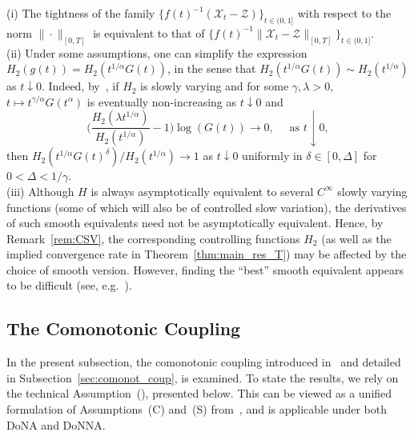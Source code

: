 \documentclass[en,oneside,bbfont,article]{amsart}
\theoremstyle{remark}
\newenvironment{remark}
    {\pushQED{\qed}\renewcommand{\qedsymbol}{$\Diamond$}\remarkx}
    {\popQED\endremarkx}
\theoremstyle{definition}
\theoremstyle{definition}
\newcommand\X{\bm{\mathcal{X}}}
\newcommand\ZZ{\bm{\mathcal{Z}}}
\newcommand\1{\mathds{1}}
\newcommand\da{\downarrow}
\begin{document}
\begin{remark}
\label{rem:thinning-result}
(i) The tightness of the family $\{f(t)^{-1}(\X_t-\ZZ)\}_{t\in(0,1]}$ with respect to the norm $\|\cdot\|_{[0,T]}$ is equivalent to that of $\{f(t)^{-1}\|\X_t-\ZZ\|_{[0,T]}\}_{t\in(0,1]}$.\\
(ii) Under some assumptions, one can simplify the expression $H_2(g(t))=H_2(t^{1/\alpha}G(t))$, in the sense that $H_2(t^{1/\alpha} G(t))\sim H_2(t^{1/\alpha})$ as $t\da 0$. Indeed, by~\cite[Thm~2.3.1]{MR1015093}, if $H_2$ is slowly varying and for some $\gamma,\lambda>0$, $t\mapsto t^{\gamma/\alpha}G(t^\alpha)$ is eventually non-increasing as $t \da 0$ and 
\begin{equation*}
\bigg(\frac{H_2(\lambda t^{1/\alpha})}{H_2(t^{1/\alpha})}-1\bigg)\log (G(t)) \to 0, \quad \text{ as }t \da 0,
\end{equation*} 
then $H_2(t^{1/\alpha} G(t)^\delta)/ H_2(t^{1/\alpha})\to 1$ as $t \da 0$ uniformly in $\delta \in [0,\Delta]$ for $0<\Delta<1/\gamma $.\\
(iii) Although $H$ is always asymptotically equivalent to several $C^\infty$ slowly varying functions (some of which will also be of controlled slow variation), the derivatives of such smooth equivalents need not be asymptotically equivalent. Hence, by Remark~\ref{rem:CSV}, the corresponding controlling functions $H_2$ (as well as the implied convergence rate in Theorem~\ref{thm:main_res_T}) may be affected by the choice of smooth version. However, finding the ``best'' smooth equivalent appears to be difficult (see, e.g.~\cite[Rem.~2.5(IV)]{WassersteinPaper}).
\end{remark}

\subsection{The Comonotonic Coupling}
\label{subsec:como}
In the present subsection, the comonotonic coupling introduced in~\cite[Sec.~3.2]{WassersteinPaper} and detailed in Subsection~\ref{sec:comonot_coup}, is examined. To state the results, we rely on the technical Assumption~(), presented below. This can be viewed as a unified formulation of Assumptions~(C) and~(S) from~\cite[Asms~(C) \&~(S)]{WassersteinPaper}, and is applicable under both DoNA and DoNNA.
\end{document}
